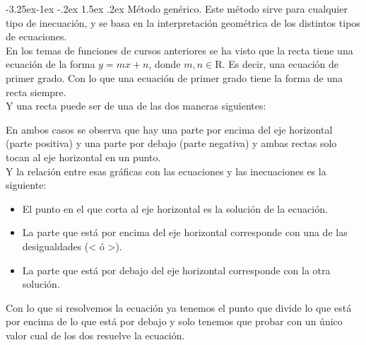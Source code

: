 \documentclass[a4paper,11pt,answers]{exam}
\makeatletter
\renewcommand\paragraph{\@startsection{paragraph}{4}{\z@}%
                                     {-3.25ex\@plus -1ex \@minus -.2ex}%
                                     {1.5ex \@plus .2ex}%
                                     {\normalfont\normalsize\bfseries}}
\makeatother
\begin{document}
  \paragraph{Método genérico.}
  Este método sirve para cualquier tipo de inecuación, y se basa en la interpretación geométrica de los distintos
  tipos de ecuaciones.\\

  En los temas de funciones de cursos anteriores se ha visto que la recta tiene una ecuación de la forma
  $y = mx + n$, donde $m,n \in \mathrm{R}$. Es decir, una ecuación de primer grado. Con lo que una ecuación
  de primer grado tiene la forma de una recta siempre.\\

  Y una recta puede ser de una de las dos maneras siguientes:
  \begin{center}
\quad\quad\quad
{}
\end{center}
En ambos casos se observa que hay una parte por encima del eje horizontal (parte positiva) y una
parte por debajo (parte negativa) y ambas rectas solo tocan al eje horizontal en un punto.\\
Y la relación entre esas gráficas con las ecuaciones y las inecuaciones es la siguiente:
\begin{itemize}
\item El punto en el que corta al eje horizontal es la solución de la ecuación.
\item La parte que está por encima del eje horizontal corresponde con una de las
  desigualdades (< ó >).
\item La parte que está por debajo del eje horizontal corresponde con la otra solución.
\end{itemize}
Con lo que si resolvemos la ecuación ya tenemos el punto que divide lo que está por encima de
lo que está por debajo y solo tenemos que probar con un único valor cual de los dos resuelve la
ecuación.\\
\end{document}
